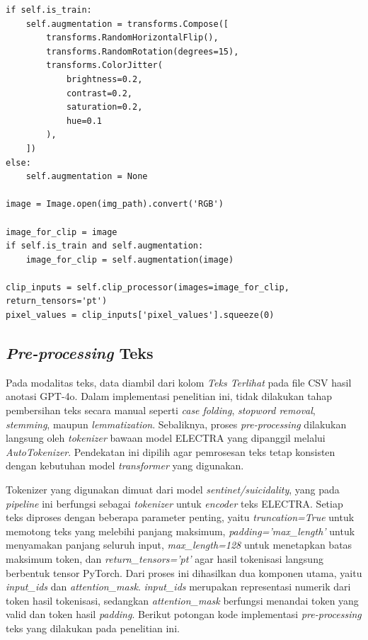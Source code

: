 \begin{lstlisting}[caption={Kode \textit{pre-processing} gambar}, label={code:4.preprocessing_gambar}]
if self.is_train:
    self.augmentation = transforms.Compose([
        transforms.RandomHorizontalFlip(),
        transforms.RandomRotation(degrees=15),
        transforms.ColorJitter(
            brightness=0.2,
            contrast=0.2,
            saturation=0.2,
            hue=0.1
        ),
    ])
else:
    self.augmentation = None

image = Image.open(img_path).convert('RGB')

image_for_clip = image
if self.is_train and self.augmentation:
    image_for_clip = self.augmentation(image)

clip_inputs = self.clip_processor(images=image_for_clip, return_tensors='pt')
pixel_values = clip_inputs['pixel_values'].squeeze(0)
\end{lstlisting}


\subsection{\textit{Pre-processing} Teks} \label{IV.Preprocessing.Teks}

Pada modalitas teks, data diambil dari kolom \textit{Teks Terlihat} pada file CSV hasil anotasi GPT-4o. Dalam implementasi penelitian ini, tidak dilakukan tahap pembersihan teks secara manual seperti \textit{case folding}, \textit{stopword removal}, \textit{stemming}, maupun \textit{lemmatization}. Sebaliknya, proses \textit{pre-processing} dilakukan langsung oleh \textit{tokenizer} bawaan model ELECTRA yang dipanggil melalui \textit{AutoTokenizer}. Pendekatan ini dipilih agar pemrosesan teks tetap konsisten dengan kebutuhan model \textit{transformer} yang digunakan.

Tokenizer yang digunakan dimuat dari model \textit{sentinet/suicidality}, yang pada \textit{pipeline} ini berfungsi sebagai \textit{tokenizer} untuk \textit{encoder} teks ELECTRA. Setiap teks diproses dengan beberapa parameter penting, yaitu \textit{truncation=True} untuk memotong teks yang melebihi panjang maksimum, \textit{padding='max\_length'} untuk menyamakan panjang seluruh input, \textit{max\_length=128} untuk menetapkan batas maksimum token, dan \textit{return\_tensors='pt'} agar hasil tokenisasi langsung berbentuk tensor PyTorch. Dari proses ini dihasilkan dua komponen utama, yaitu \textit{input\_ids} dan \textit{attention\_mask}. \textit{input\_ids} merupakan representasi numerik dari token hasil tokenisasi, sedangkan \textit{attention\_mask} berfungsi menandai token yang valid dan token hasil \textit{padding}. Berikut potongan kode implementasi \textit{pre-processing} teks yang dilakukan pada penelitian ini.

